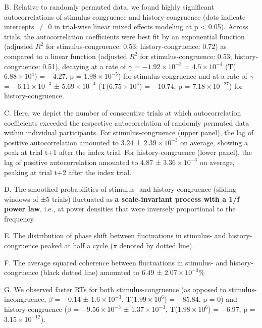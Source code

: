 \documentclass[
]{article}
\begin{document}
B. Relative to randomly permuted data, we found highly significant
autocorrelations of stimulus-congruence and history-congruence (dots
indicate intercepts \(\neq\) 0 in trial-wise linear mixed effects
modeling at p \textless{} 0.05). Across trials, the autocorrelation
coefficients were best fit by an exponential function (adjusted \(R^2\)
for stimulus-congruence: 0.53; history-congruence: 0.72) as compared to
a linear function (adjusted \(R^2\) for stimulus-congruence: 0.53;
history-congruence: 0.51), decaying at a rate of \(\gamma\) =
\(\ensuremath{-1.92\times 10^{-3}}\) ±
\(\ensuremath{4.5\times 10^{-4}}\)
(T(\(\ensuremath{6.88\times 10^{4}}\)) = \(-4.27\), p =
\(\ensuremath{1.98\times 10^{-5}}\)) for stimulus-congruence and at a
rate of \(\gamma\) = \(\ensuremath{-6.11\times 10^{-3}}\) ±
\(\ensuremath{5.69\times 10^{-4}}\)
(T(\(\ensuremath{6.75\times 10^{4}}\)) = \(-10.74\), p =
\(\ensuremath{7.18\times 10^{-27}}\)) for history-congruence.

C. Here, we depict the number of consecutive trials at which
autocorrelation coefficients exceeded the respective autocorrelation of
randomly permuted data within individual participants. For
stimulus-congruence (upper panel), the lag of positive autocorrelation
amounted to \(3.24\) ± \(\ensuremath{2.39\times 10^{-3}}\) on average,
showing a peak at trial t+1 after the index trial. For
history-congruence (lower panel), the lag of positive autocorrelation
amounted to \(4.87\) ± \(\ensuremath{3.36\times 10^{-3}}\) on average,
peaking at trial t+2 after the index trial.

D. The smoothed probabilities of stimulus- and history-congruence
(sliding windows of ±5 trials) fluctuated as \textbf{a scale-invariant
process with a 1/f power law}, i.e., at power densities that were
inversely proportional to the frequency.

E. The distribution of phase shift between fluctuations in stimulus- and
history-congruence peaked at half a cycle (\(\pi\) denoted by dotted
line).

F. The average squared coherence between fluctuations in stimulus- and
history-congruence (black dotted line) amounted to \(6.49\) ±
\(\ensuremath{2.07\times 10^{-3}}\)\%

G. We observed faster RTs for both stimulus-congruence (as opposed to
stimulus-incongruence, \(\beta\) = \(-0.14\) ±
\(\ensuremath{1.6\times 10^{-3}}\),
T(\(\ensuremath{1.99\times 10^{6}}\)) = \(-85.84\), p = \(0\)) and
history-congruence (\(\beta\) = \(\ensuremath{-9.56\times 10^{-3}}\) ±
\(\ensuremath{1.37\times 10^{-3}}\),
T(\(\ensuremath{1.98\times 10^{6}}\)) = \(-6.97\), p =
\(\ensuremath{3.15\times 10^{-12}}\)).
\end{document}
